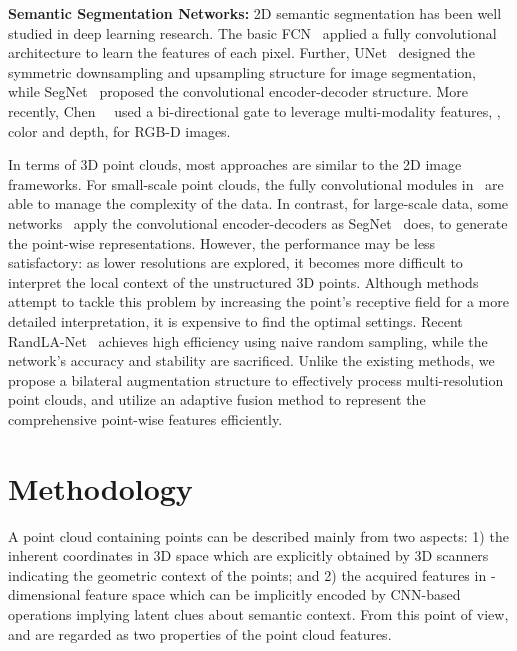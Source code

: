 \documentclass[10pt,twocolumn,letterpaper]{article}
\begin{document}
\vspace{1mm}
\noindent \textbf{Semantic Segmentation Networks:} 2D semantic segmentation has been well studied in deep learning research. The basic FCN~\cite{long2015fully} applied a fully convolutional architecture to learn the features of each pixel. Further, UNet~\cite{ronneberger2015u} designed the symmetric downsampling and upsampling structure for image segmentation, while SegNet~\cite{badrinarayanan2017segnet} proposed the convolutional encoder-decoder structure. More recently, Chen~\etal~\cite{chen2020bidirectional} used a bi-directional gate to leverage multi-modality features, \ie, color and depth, for RGB-D images. 

In terms of 3D point clouds, most approaches are similar to the 2D image frameworks. For small-scale point clouds, the fully convolutional modules in~\cite{qi2017pointnet, wang2019dynamic, qiu2019geometric} are able to manage the complexity of the data. In contrast, for large-scale data, some networks~\cite{qi2017pointnet++, liu2019relation, hu2020randla, yan2020pointasnl} apply the convolutional encoder-decoders as SegNet~\cite{badrinarayanan2017segnet} does, to generate the point-wise representations. However, the performance may be less satisfactory: as lower resolutions are explored, it becomes more difficult to interpret the local context of the unstructured 3D points. Although methods~\cite{engelmann2020dilated, hu2020randla, qiu2021dense} attempt to tackle this problem by increasing the point's receptive field for a more detailed interpretation, it is expensive to find the optimal settings. Recent RandLA-Net~\cite{hu2020randla} achieves high efficiency using naive random sampling, while the network's accuracy and stability are sacrificed. Unlike the existing methods, we propose a bilateral augmentation structure to effectively process multi-resolution point clouds, and utilize an adaptive fusion method to represent the comprehensive point-wise features efficiently.
%
 \section{Methodology}
\label{sec:metho}
A point cloud containing  points can be described mainly from two aspects: 1) the inherent coordinates in 3D space  which are explicitly obtained by 3D scanners indicating the geometric context of the points; and 2) the acquired features  in -dimensional feature space which can be implicitly encoded by CNN-based operations implying latent clues about semantic context. From this point of view,  and  are regarded as two properties of the point cloud features.
\end{document}
